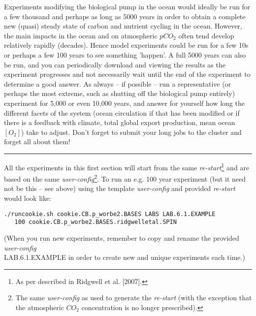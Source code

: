 \newpage
%
Experiments modifying the biological pump in the ocean would ideally be run for a few thousand and perhaps as long as 5000 years in order to obtain a complete new (quasi) steady state of carbon and nutrient cycling in the ocean. However, the main impacts in the ocean and on atmospheric \(pCO_{2}\) often tend develop relatively rapidly (decades). Hence model experiments could be run for a few 10s or perhaps a few 100 years to see something 'happen'.  A full 5000 years can also be run, and you can periodically download and viewing the results as the experiment progresses and not necessarily wait until the end of the experiment to determine a good answer. As always -- if possible -- run a representative (or perhaps the most extreme, such as shutting off the biological pump entirely) experiment for 5,000 or even 10,000 years, and answer for yourself how long the different facets of the system (ocean circulation if that has been modified or if there is a feedback with climate, total global export production, mean ocean \([O_{2}]\)) take to adjust. Don't forget to submit your long jobs to the cluster and forget all about them!

\vspace{1mm}
\noindent\rule{4cm}{0.5pt}
\vspace{2mm}

\noindent All the experiments in this first section will start from the same \textit{re-start}\footnote{As per described in Ridgwell et al. [2007].} and are based on the same \textit{user-config}\footnote{The same \textit{user-config} as used to generate the \textit{re-start} (with the exception that the atmospheric \(CO_{2}\) concentration is no longer prescribed).}. To run an e.g. 100 year experiment (but it need not be this -- see above) using the template \textit{user-config} and provided \textit{re-start} would look like:
\vspace{-1mm}\small\begin{verbatim}
./runcookie.sh cookie.CB.p_worbe2.BASES LABS LAB.6.1.EXAMPLE 
   100 cookie.CB.p_worbe2.BASES.ridgwelletal.SPIN
\end{verbatim}\normalsize\vspace{-1mm}
(When you run new experiments, remember to copy and rename the provided \textit{user-config} \\\textsf{\footnotesize LAB.6.1.EXAMPLE} in order to create new and unique experiments each time.)

